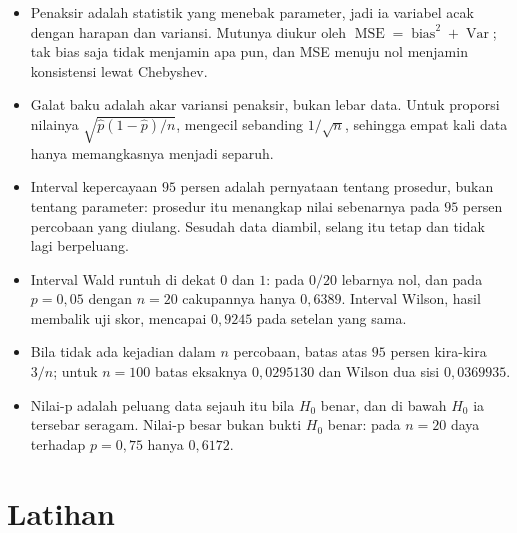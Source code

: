 \begin{ringkasan}
\begin{itemize}
  \item Penaksir adalah statistik yang menebak parameter, jadi ia variabel acak dengan
        harapan dan variansi. Mutunya diukur oleh
        $\operatorname{MSE}=\operatorname{bias}^2+\operatorname{Var}$; tak bias saja
        tidak menjamin apa pun, dan MSE menuju nol menjamin konsistensi lewat
        Chebyshev.
  \item Galat baku adalah akar variansi penaksir, bukan lebar data. Untuk proporsi
        nilainya $\sqrt{\hat p(1-\hat p)/n}$, mengecil sebanding $1/\sqrt n$,
        sehingga empat kali data hanya memangkasnya menjadi separuh.
  \item Interval kepercayaan $95$ persen adalah pernyataan tentang prosedur, bukan
        tentang parameter: prosedur itu menangkap nilai sebenarnya pada $95$ persen
        percobaan yang diulang. Sesudah data diambil, selang itu tetap dan tidak lagi
        berpeluang.
  \item Interval Wald runtuh di dekat $0$ dan $1$: pada $0/20$ lebarnya nol, dan pada
        $p=0{,}05$ dengan $n=20$ cakupannya hanya $0{,}6389$. Interval Wilson, hasil
        membalik uji skor, mencapai $0{,}9245$ pada setelan yang sama.
  \item Bila tidak ada kejadian dalam $n$ percobaan, batas atas $95$ persen kira-kira
        $3/n$; untuk $n=100$ batas eksaknya $0{,}0295130$ dan Wilson dua sisi
        $0{,}0369935$.
  \item Nilai-p adalah peluang data sejauh itu bila $H_0$ benar, dan di bawah $H_0$
        ia tersebar seragam. Nilai-p besar bukan bukti $H_0$ benar: pada $n=20$ daya
        terhadap $p=0{,}75$ hanya $0{,}6172$.
\end{itemize}
\end{ringkasan}

\section{Latihan}


